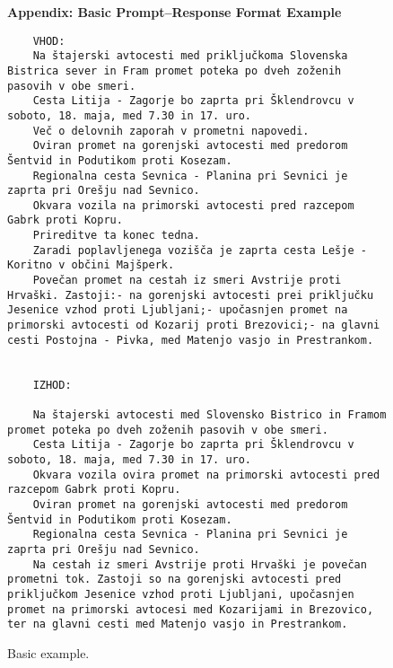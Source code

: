 \begin{figure*}[t]
    \centering
    \caption*{\textbf{Appendix: Basic Prompt–Response Format Example}} %
    \vspace{1mm}
    \begin{verbatim}
    VHOD:
    Na štajerski avtocesti med priključkoma Slovenska Bistrica sever in Fram promet poteka po dveh zoženih pasovih v obe smeri.
    Cesta Litija - Zagorje bo zaprta pri Šklendrovcu v soboto, 18. maja, med 7.30 in 17. uro.
    Več o delovnih zaporah v prometni napovedi.
    Oviran promet na gorenjski avtocesti med predorom Šentvid in Podutikom proti Kosezam.
    Regionalna cesta Sevnica - Planina pri Sevnici je zaprta pri Orešju nad Sevnico.
    Okvara vozila na primorski avtocesti pred razcepom Gabrk proti Kopru.
    Prireditve ta konec tedna.
    Zaradi poplavljenega vozišča je zaprta cesta Lešje - Koritno v občini Majšperk.
    Povečan promet na cestah iz smeri Avstrije proti Hrvaški. Zastoji:- na gorenjski avtocesti prei priključku Jesenice vzhod proti Ljubljani;- upočasnjen promet na primorski avtocesti od Kozarij proti Brezovici;- na glavni cesti Postojna - Pivka, med Matenjo vasjo in Prestrankom.


    IZHOD:

    Na štajerski avtocesti med Slovensko Bistrico in Framom promet poteka po dveh zoženih pasovih v obe smeri.
    Cesta Litija - Zagorje bo zaprta pri Šklendrovcu v soboto, 18. maja, med 7.30 in 17. uro.
    Okvara vozila ovira promet na primorski avtocesti pred razcepom Gabrk proti Kopru.
    Oviran promet na gorenjski avtocesti med predorom Šentvid in Podutikom proti Kosezam.
    Regionalna cesta Sevnica - Planina pri Sevnici je zaprta pri Orešju nad Sevnico.
    Na cestah iz smeri Avstrije proti Hrvaški je povečan prometni tok. Zastoji so na gorenjski avtocesti pred priključkom Jesenice vzhod proti Ljubljani, upočasnjen promet na primorski avtocesi med Kozarijami in Brezovico, ter na glavni cesti med Matenjo vasjo in Prestrankom.

    \end{verbatim}
    \caption{Basic example.}
    \label{fig:result_basic}
\end{figure*}

